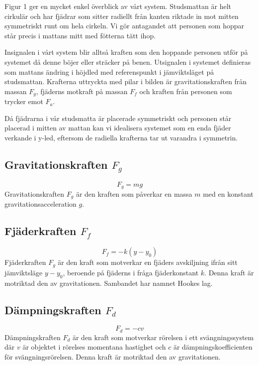\documentclass[10pt,a4paper]{article}
\begin{document}
Figur 1 ger en mycket enkel överblick av vårt system. Studsmattan är helt cirkulär och har fjädrar som sitter radiellt från kanten riktade in mot mitten symmetriskt runt om hela cirkeln. Vi gör antagandet att personen som hoppar står precis i mattans mitt med fötterna tätt ihop.


Insignalen i vårt system blir alltså kraften som den hoppande personen utför på systemet då denne böjer eller sträcker på benen. Utsignalen i systemet definieras som mattans ändring i höjdled med referenspunkt i jämviktsläget på studsmattan.
Krafterna uttryckta med pilar i bilden är gravitationskraften från massan $F_g$, fjäderns motkraft på massan $F_f$ och kraften från personen som trycker emot $F_a$.

Då fjädrarna i vår studsmatta är placerade symmetriskt och personen står placerad i mitten av mattan kan vi idealisera systemet som en enda fjäder verkande i y-led, eftersom de radiella krafterna tar ut varandra i symmetrin.

\subsection{Gravitationskraften $F_g$}

\begin{equation}
F_g = mg
\end{equation}
Gravitationskraften $F_g$ är den kraften som påverkar en massa $m$ med en konstant gravitationsacceleration $g$. 

\subsection{Fjäderkraften $F_f$}

\begin{equation}
F_f = -k(y - y_0)
\end{equation}
Fjäderkraften $F_g$ är den kraft som motverkar en fjäders avskiljning ifrån sitt jämviktsläge $y-y_0$, beroende på fjäderns i fråga fjäderkonstant $k$. Denna kraft är motriktad den av gravitationen. Sambandet har namnet Hookes lag.

\subsection{Dämpningskraften $F_d$}
\begin{equation}
F_d = -cv
\end{equation}
Dämpningskraften $F_d$ är den kraft som motverkar rörelsen i ett svängningssystem där $v$ är objektet i rörelses momentana hastighet och $c$ är dämpningskoefficienten för svängningsrörelsen. Denna kraft är motriktad den av gravitationen.
\end{document}
